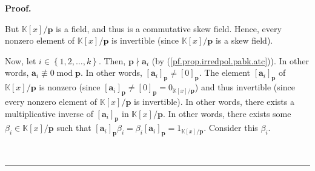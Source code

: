 \documentclass[numbers=enddot,12pt,final,onecolumn,notitlepage]{scrartcl}%
\theoremstyle{definition}
\newenvironment{fineprint}{\begin{small}}{\end{small}}
\newenvironment{proof}[1][Proof]{\noindent\textbf{#1.} }{\ \rule{0.5em}{0.5em}}
\begin{document}
\begin{proof}
\begin{fineprint}
But $\mathbb{K}\left[  x\right]  /\mathbf{p}$ is a field, and thus is a
commutative skew field. Hence, every nonzero element of $\mathbb{K}\left[
x\right]  /\mathbf{p}$ is invertible (since $\mathbb{K}\left[  x\right]
/\mathbf{p}$ is a skew field).

Now, let $i\in\left\{  1,2,\ldots,k\right\}  $. Then, $\mathbf{p}%
\nmid\mathbf{a}_{i}$ (by (\ref{pf.prop.irredpol.pabk.atc})). In other words,
$\mathbf{a}_{i}\not \equiv 0\operatorname{mod}\mathbf{p}$. In other words,
$\left[  \mathbf{a}_{i}\right]  _{\mathbf{p}}\neq\left[  0\right]
_{\mathbf{p}}$. The element $\left[  \mathbf{a}_{i}\right]  _{\mathbf{p}}$ of
$\mathbb{K}\left[  x\right]  /\mathbf{p}$ is nonzero (since $\left[
\mathbf{a}_{i}\right]  _{\mathbf{p}}\neq\left[  0\right]  _{\mathbf{p}%
}=0_{\mathbb{K}\left[  x\right]  /\mathbf{p}}$) and thus invertible (since
every nonzero element of $\mathbb{K}\left[  x\right]  /\mathbf{p}$ is
invertible). In other words, there exists a multiplicative inverse of $\left[
\mathbf{a}_{i}\right]  _{\mathbf{p}}$ in $\mathbb{K}\left[  x\right]
/\mathbf{p}$. In other words, there exists some $\beta_{i}\in\mathbb{K}\left[
x\right]  /\mathbf{p}$ such that $\left[  \mathbf{a}_{i}\right]  _{\mathbf{p}%
}\beta_{i}=\beta_{i}\left[  \mathbf{a}_{i}\right]  _{\mathbf{p}}%
=1_{\mathbb{K}\left[  x\right]  /\mathbf{p}}$. Consider this $\beta_{i}$.


\end{fineprint}
\end{proof}
\end{document}
